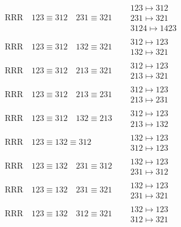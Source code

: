 \documentclass{article}
\begin{document}
\begin{align}
\\
\text{RRR}
\quad
123\equiv312
\quad
231\equiv321
\quad
&
\begin{matrix}
123 \mapsto 312
\\
231 \mapsto 321
\\
3124 \mapsto 1423
\end{matrix}
\\
\text{RRR}
\quad
123\equiv312
\quad
132\equiv321
\quad
&
\begin{matrix}
312 \mapsto 123
\\
132 \mapsto 321
\end{matrix}
\\
\text{RRR}
\quad
123\equiv312
\quad
213\equiv321
\quad
&
\begin{matrix}
312 \mapsto 123
\\
213 \mapsto 321
\end{matrix}
\\
\text{RRR}
\quad
123\equiv312
\quad
213\equiv231
\quad
&
\begin{matrix}
312 \mapsto 123
\\
213 \mapsto 231
\end{matrix}
\\
\text{RRR}
\quad
123\equiv312
\quad
132\equiv213
\quad
&
\begin{matrix}
312 \mapsto 123
\\
213 \mapsto 132
\end{matrix}
\\
\text{RRR}
\quad
123\equiv132\equiv312
\quad
&
\begin{matrix}
132 \mapsto 123
\\
312 \mapsto 123
\end{matrix}
\\
\text{RRR}
\quad
123\equiv132
\quad
231\equiv312
\quad
&
\begin{matrix}
132 \mapsto 123
\\
231 \mapsto 312
\end{matrix}
\\
\text{RRR}
\quad
123\equiv132
\quad
231\equiv321
\quad
&
\begin{matrix}
132 \mapsto 123
\\
231 \mapsto 321
\end{matrix}
\\
\text{RRR}
\quad
123\equiv132
\quad
312\equiv321
\quad
&
\begin{matrix}
132 \mapsto 123
\\
312 \mapsto 321
\end{matrix}
\\

\end{align}
\end{document}
